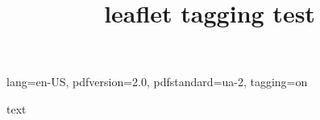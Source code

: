\DocumentMetadata
  {
    lang=en-US,
    pdfversion=2.0,
    pdfstandard=ua-2,
    tagging=on
  }

\title{leaflet tagging test}



text

